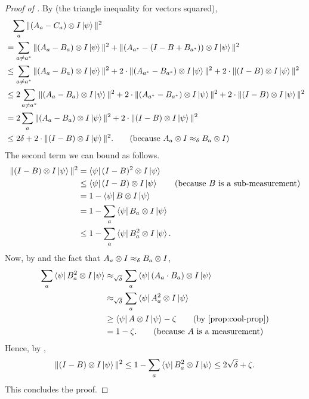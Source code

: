 		\begin{proof}[Proof of ]
		By  (the triangle inequality for vectors squared),
		\begin{align*}
		&\phantom{=}\sum_a \Vert(A_a - C_a)\ot I \ket{\psi} \Vert^2\\
		& = \sum_{a \neq a^*} \Vert(A_a - B_a)\ot I \ket{\psi} \Vert^2 + \Vert(A_{a^*}  - (I-B + B_{a^*}))\ot I\ket{\psi}\Vert^2\\
		& \leq \sum_{a \neq a^*} \Vert(A_a - B_a)\ot I \ket{\psi} \Vert^2 + 2 \cdot \Vert(A_{a^*}  -  B_{a^*})\ot I\ket{\psi}\Vert^2 + 2 \cdot \Vert(I - B) \ot I\ket{\psi}\Vert^2\\
		& \leq 2\sum_{a \neq a^*} \Vert(A_a - B_a)\ot I \ket{\psi} \Vert^2 + 2 \cdot \Vert(A_{a^*}  -  B_{a^*})\ot I\ket{\psi}\Vert^2 + 2 \cdot \Vert(I - B) \ot I\ket{\psi}\Vert^2\\
		& = 2\sum_{a} \Vert(A_a - B_a)\ot I \ket{\psi} \Vert^2 + 2 \cdot \Vert(I - B)\ot I \ket{\psi}\Vert^2\\
		& \leq 2 \delta + 2 \cdot \Vert(I - B)\ot I \ket{\psi}\Vert^2. \tag{because $A_a \ot I \approx_{\delta} B_a \ot I$}
		\end{align*}
		The second term we can bound as follows.
		\begin{align}
		\Vert(I - B) \otimes I \ket{\psi}\Vert^2
		& = \bra{\psi} (I-B)^2 \otimes I \ket{\psi}\nonumber\\
		& \leq \bra{\psi} (I-B)\otimes I \ket{\psi} \tag{because~$B$ is a sub-measurement}\\
		& = 1 - \bra{\psi} B\otimes I \ket{\psi}\nonumber\\
		& = 1 - \sum_a \bra{\psi} B_a \otimes I \ket{\psi}\nonumber\\
		& \leq 1 -\sum_a \bra{\psi} B_a^2 \otimes I \ket{\psi}.\label{eq:to-return-later-whatevs}
		\end{align}
		Now, by  and the fact that $A_a\otimes I \approx_{\delta} B_a\otimes I$,
		\begin{align*}
		\sum_a \bra{\psi} B_a^2 \ot I \ket{\psi}
		& \approx_{\sqrt{\delta}} \sum_a \bra{\psi} (A_a \cdot B_a)\ot I \ket{\psi}\\
		& \approx_{\sqrt{\delta}} \sum_a \bra{\psi} A_a^2\ot I \ket{\psi}\\
		& \geq  \bra{\psi} A \ot I \ket{\psi}- \zeta \tag{by \Cref{prop:cool-prop}}\\
		& = 1 - \zeta. \tag{because~$A$ is a measurement}
		\end{align*}
		Hence, by ,
		\begin{equation*}
		\Vert(I - B) \otimes I \ket{\psi}\Vert^2 \leq 1 -\sum_a \bra{\psi} B_a^2 \otimes I \ket{\psi} \leq 2\sqrt{\delta} + \zeta.
		\end{equation*}
		This concludes the proof.
		\end{proof}


